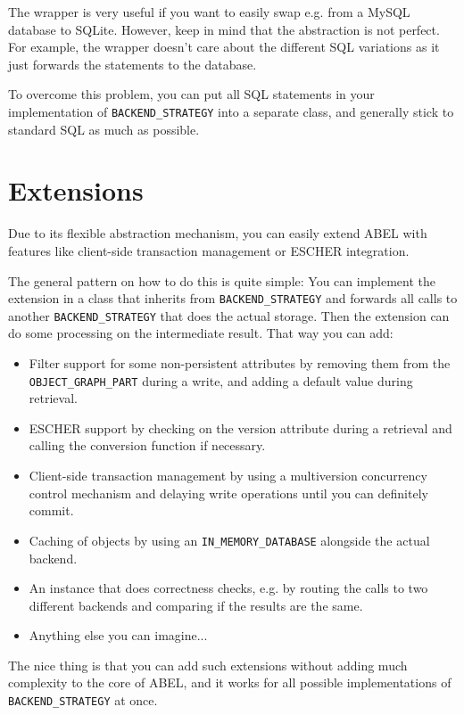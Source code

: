 The wrapper is very useful if you want to easily swap e.g. from a MySQL database to SQLite.
However, keep in mind that the abstraction is not perfect. 
For example, the wrapper doesn't care about the different SQL variations as it just forwards the statements to the database.

To overcome this problem, you can put all SQL statements in your implementation of \lstinline!BACKEND_STRATEGY! into a separate class, and generally stick to standard SQL as much as possible.


\section{Extensions}

Due to its flexible abstraction mechanism, you can easily extend ABEL with features like client-side transaction management or ESCHER \cite {PiccioniOriolMeyer12} integration.

The general pattern on how to do this is quite simple: 
You can implement the extension in a class that inherits from \lstinline!BACKEND_STRATEGY! and forwards all calls to another \lstinline!BACKEND_STRATEGY! that does the actual storage.
Then the extension can do some processing on the intermediate result.
That way you can add:

\begin{itemize}
 \item Filter support for some non-persistent attributes by removing them from the \lstinline!OBJECT_GRAPH_PART! during a write, and adding a default value during retrieval.
 \item ESCHER support by checking on the version attribute during a retrieval and calling the conversion function if necessary.
 \item Client-side transaction management by using a multiversion concurrency control mechanism and delaying write operations until you can definitely commit.
 \item Caching of objects by using an \lstinline!IN_MEMORY_DATABASE! alongside the actual backend.
 \item An instance that does correctness checks, e.g. by routing the calls to two different backends and comparing if the results are the same.
 \item Anything else you can imagine...
\end{itemize}

The nice thing is that you can add such extensions without adding much complexity to the core of ABEL, and it works for all possible implementations of \lstinline!BACKEND_STRATEGY! at once.


